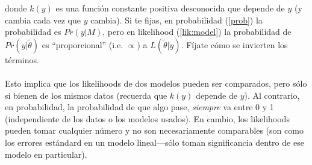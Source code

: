 \documentclass[10pt]{article}
\begin{document}
donde $k(y)$ es una funci\'on constante positiva desconocida que depende de $y$ (y cambia cada vez que $y$ cambia). Si te fijas, en probabilidad (\autoref{prob}) la probabilidad es $Pr(y|M)$, pero en likelihood (\autoref{lik:model}) la probabilidad de $Pr(y|\tilde{\theta})$ es ``proporcional'' (i.e. $\propto$) a $L(\tilde{\theta}|y)$. F\'ijate c\'omo se invierten los t\'erminos.

\paragraph{} Esto implica que los likelihoods de dos modelos pueden ser comparados, pero s\'olo si bienen de los mismos datos (recuerda que $k(y)$ depende de $y$). Al contrario, en probabilidad, la probabilidad de que algo pase, \emph{siempre} va entre 0 y 1 (independiente de los datos o los modelos usados). En cambio, los likelihoods pueden tomar cualquier n\'umero y no son necesariamente comparables (son como los errores est\'andard en un modelo lineal---s\'olo toman significancia dentro de ese modelo en particular).


\paragraph{}
\paragraph{}
\setcounter{page}{1}
\printbibliography
\end{document}
